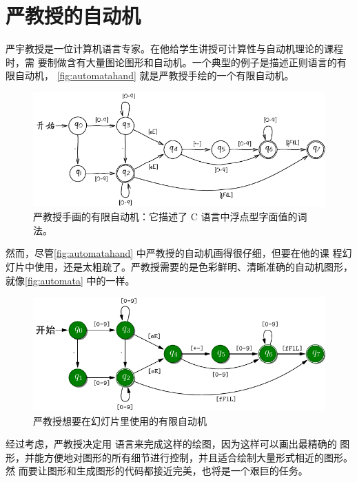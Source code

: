 
\chapter{严教授的自动机}

严宇教授是一位计算机语言专家。在他给学生讲授可计算性与自动机理论的课程时，需
要制做含有大量图论图形和自动机。一个典型的例子是描述正则语言的有限自动机，
\autoref{fig:automatahand} 就是严教授手绘的一个有限自动机。
\begin{figure}[htpb]
  \centering
  \includegraphics[scale=1.5]{automata_hand.pdf}
  \caption{严教授手画的有限自动机：它描述了 C 语言中浮点型字面值的词法。}
  \label{fig:automatahand}
\end{figure}

然而，尽管\autoref{fig:automatahand} 中严教授的自动机画得很仔细，但要在他的课
程幻灯片中使用，还是太粗疏了。严教授需要的是色彩鲜明、清晰准确的自动机图形，
就像\autoref{fig:automata} 中的一样。
\begin{figure}[htpb]
  \centering
  \includegraphics[scale=1.5]{automata.pdf}
  \caption{严教授想要在幻灯片里使用的有限自动机}
  \label{fig:automata}
\end{figure}

经过考虑，严教授决定用 \Asy{} 语言来完成这样的绘图，因为这样可以画出最精确的
图形，并能方便地对图形的所有细节进行控制，并且适合绘制大量形式相近的图形。然
而要让图形和生成图形的代码都接近完美，也将是一个艰巨的任务。


